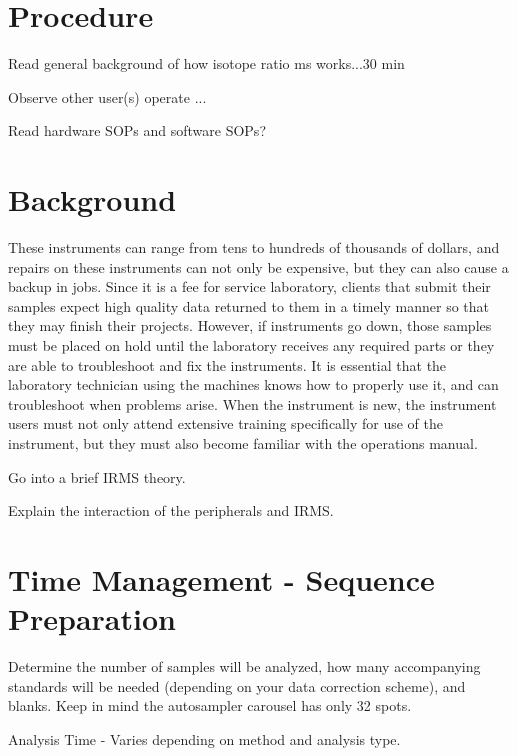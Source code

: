 \documentclass[12pt]{../SOP3_beta}\usepackage[]{graphicx}\usepackage[]{color}
\begin{document}

\section{Procedure}

\NP Read general background of how isotope ratio ms works...30 min

\NP Observe other user(s) operate ...

\NP Read hardware SOPs and software SOPs?

\section{Background}

These instruments can range from tens to hundreds of thousands of dollars, and repairs on these instruments can not only be expensive, but they can also cause a backup in jobs. Since it is a fee for service laboratory, clients that submit their samples expect high quality data returned to them in a timely manner so that they may finish their projects. However, if instruments go down, those samples must be placed on hold until the laboratory receives any required parts or they are able to troubleshoot and fix the instruments. It is essential that the laboratory technician using the machines knows how to properly use it, and can troubleshoot when problems arise. When the instrument is new, the instrument users must not only attend extensive training specifically for use of the instrument, but they must also become familiar with the operations manual.

Go into a brief IRMS theory.

Explain the interaction of the peripherals and IRMS.

\section{Time Management - Sequence Preparation}

\NP Determine the number of samples will be analyzed, how many accompanying standards will be needed (depending on your data correction scheme), and blanks. Keep in mind the autosampler carousel has only 32 spots.

\NP Analysis Time - Varies depending on method and analysis type. 
\end{document}
